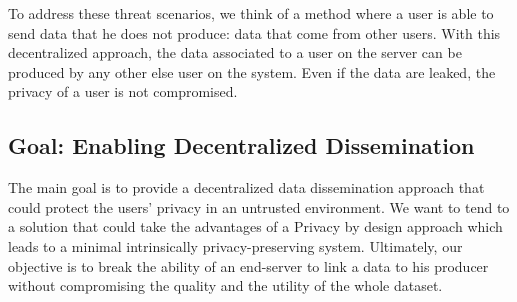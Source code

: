To address these threat scenarios, we think of a method where a user is able to send data that he does not produce: data that come from other users.
With this decentralized approach, the data associated to a user on the server can be produced by any other else user on the system.
Even if the data are leaked, the privacy of a user is not compromised.

\subsection{Goal: Enabling Decentralized Dissemination}

The main goal is to provide a decentralized data dissemination approach that could protect the users' privacy in an untrusted environment.
We want to tend to a solution that could take the advantages of a Privacy by design approach which leads to a minimal intrinsically privacy-preserving system.
Ultimately, our objective is to break the ability of an end-server to link a data to his producer without compromising the quality and the utility of the whole dataset.

